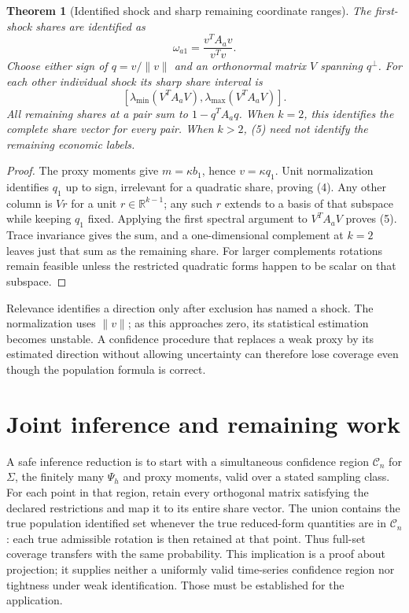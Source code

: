 \documentclass[11pt]{article}
\newtheorem{theorem}{Theorem}
\theoremstyle{remark}
\newcommand{\R}{\mathbb R}
\begin{document}
\begin{theorem}[Identified shock and sharp remaining coordinate ranges]
The first-shock shares are identified as
\[
 \omega_{a1}=\frac{v^TA_av}{v^Tv}.                                 \tag{4}
\]
Choose either sign of $q=v/\|v\|$ and an orthonormal matrix $V$ spanning
$q^\perp$. For each other individual shock its sharp share interval is
\[
 [\lambda_{\min}(V^TA_aV),\lambda_{\max}(V^TA_aV)].                 \tag{5}
\]
All remaining shares at a pair sum to $1-q^TA_aq$. When $k=2$, this
identifies the complete share vector for every pair. When $k>2$, (5)
need not identify the remaining economic labels.
\end{theorem}
\begin{proof}
The proxy moments give $m=\kappa b_1$, hence $v=\kappa q_1$.
Unit normalization identifies $q_1$ up to sign, irrelevant for a quadratic
share, proving (4). Any other column is $Vr$ for a unit $r\in\R^{k-1}$;
any such $r$ extends to a basis of that subspace while keeping $q_1$ fixed.
Applying the first spectral argument to $V^TA_aV$ proves (5). Trace
invariance gives the sum, and a one-dimensional complement at $k=2$
leaves just that sum as the remaining share. For larger complements
rotations remain feasible unless the restricted quadratic forms happen
to be scalar on that subspace.
\end{proof}
Relevance identifies a direction only after exclusion has named a shock.
The normalization uses $\|v\|$; as this approaches zero, its statistical
estimation becomes unstable. A confidence procedure that replaces a weak
proxy by its estimated direction without allowing uncertainty can therefore
lose coverage even though the population formula is correct.

\section{Joint inference and remaining work}
A safe inference reduction is to start with a simultaneous confidence
region $\mathcal C_n$ for $\Sigma$, the finitely many $\Psi_h$ and proxy
moments, valid over a stated sampling class. For each point in that region,
retain every orthogonal matrix satisfying the declared restrictions and
map it to its entire share vector. The union contains the true population
identified set whenever the true reduced-form quantities are in
$\mathcal C_n$: each true admissible rotation is then retained at that
point. Thus full-set coverage transfers with the same probability.
This implication is a proof about projection; it supplies neither a
uniformly valid time-series confidence region nor tightness under weak
identification. Those must be established for the application.
\end{document}
